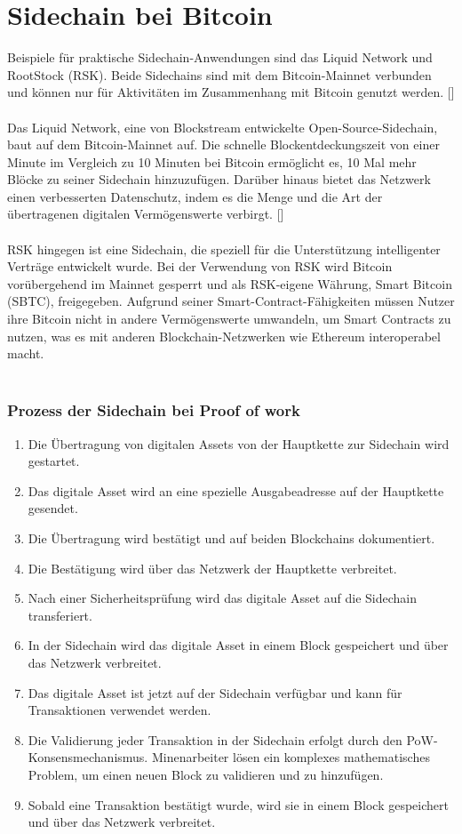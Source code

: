 \documentclass[ngerman]{scrreprt}
\begin{document}
\section{Sidechain bei Bitcoin}
Beispiele für praktische Sidechain-Anwendungen sind das Liquid Network und RootStock (RSK). Beide Sidechains sind mit dem Bitcoin-Mainnet verbunden und können nur für Aktivitäten im Zusammenhang mit Bitcoin genutzt werden. [\cite{coin_desk}] \\ \\
Das Liquid Network, eine von Blockstream entwickelte Open-Source-Sidechain, baut auf dem Bitcoin-Mainnet auf. Die schnelle Blockentdeckungszeit von einer Minute im Vergleich zu 10 Minuten bei Bitcoin ermöglicht es, 10 Mal mehr Blöcke zu seiner Sidechain hinzuzufügen. Darüber hinaus bietet das Netzwerk einen verbesserten Datenschutz, indem es die Menge und die Art der übertragenen digitalen Vermögenswerte verbirgt. [\cite{coin_desk}] \\ \\
RSK hingegen ist eine Sidechain, die speziell für die Unterstützung intelligenter Verträge entwickelt wurde. Bei der Verwendung von RSK wird Bitcoin vorübergehend im Mainnet gesperrt und als RSK-eigene Währung, Smart Bitcoin (SBTC), freigegeben.
Aufgrund seiner Smart-Contract-Fähigkeiten müssen Nutzer ihre Bitcoin nicht in andere Vermögenswerte umwandeln, um Smart Contracts zu nutzen, was es mit anderen Blockchain-Netzwerken wie Ethereum interoperabel macht. \\ \\

\subsubsection{Prozess der Sidechain bei Proof of work}

\begin{enumerate}
	\item Die Übertragung von digitalen Assets von der Hauptkette zur Sidechain wird gestartet.
	\item Das digitale Asset wird an eine spezielle Ausgabeadresse auf der Hauptkette gesendet.
	\item Die Übertragung wird bestätigt und auf beiden Blockchains dokumentiert.
	\item Die Bestätigung wird über das Netzwerk der Hauptkette verbreitet.
	\item Nach einer Sicherheitsprüfung wird das digitale Asset auf die Sidechain transferiert.
	\item In der Sidechain wird das digitale Asset in einem Block gespeichert und über das Netzwerk verbreitet.
	\item Das digitale Asset ist jetzt auf der Sidechain verfügbar und kann für Transaktionen verwendet werden.
	\item Die Validierung jeder Transaktion in der Sidechain erfolgt durch den PoW-Konsensmechanismus. Minenarbeiter lösen ein komplexes mathematisches Problem, um einen neuen Block zu validieren und zu hinzufügen.
	\item Sobald eine Transaktion bestätigt wurde, wird sie in einem Block gespeichert und über das Netzwerk verbreitet.
\end{enumerate}
\end{document}
